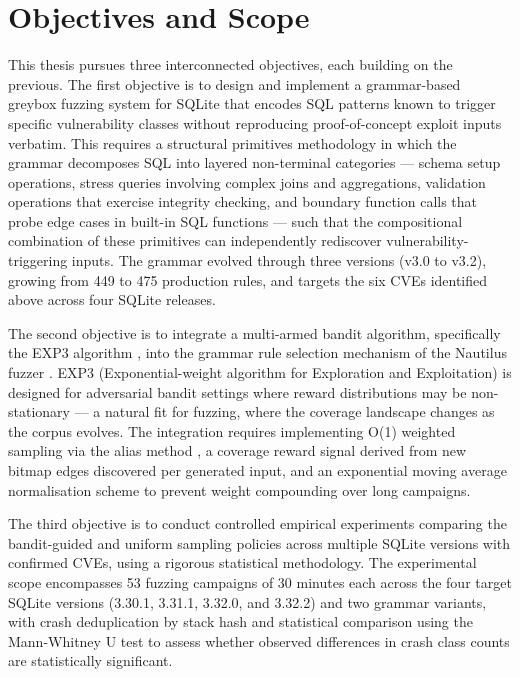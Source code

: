 \section{Objectives and Scope}

This thesis pursues three interconnected objectives, each building on the previous. The first objective is to design and implement a grammar-based greybox fuzzing system for SQLite that encodes SQL patterns known to trigger specific vulnerability classes without reproducing proof-of-concept exploit inputs verbatim. This requires a structural primitives methodology in which the grammar decomposes SQL into layered non-terminal categories — schema setup operations, stress queries involving complex joins and aggregations, validation operations that exercise integrity checking, and boundary function calls that probe edge cases in built-in SQL functions — such that the compositional combination of these primitives can independently rediscover vulnerability-triggering inputs. The grammar evolved through three versions (v3.0 to v3.2), growing from 449 to 475 production rules, and targets the six CVEs identified above across four SQLite releases.

The second objective is to integrate a multi-armed bandit algorithm, specifically the EXP3 algorithm \cite{exp3}, into the grammar rule selection mechanism of the Nautilus fuzzer \cite{nautilus}. EXP3 (Exponential-weight algorithm for Exploration and Exploitation) is designed for adversarial bandit settings where reward distributions may be non-stationary — a natural fit for fuzzing, where the coverage landscape changes as the corpus evolves. The integration requires implementing O(1) weighted sampling via the alias method \cite{loadeddice}, a coverage reward signal derived from new bitmap edges discovered per generated input, and an exponential moving average normalisation scheme to prevent weight compounding over long campaigns.

The third objective is to conduct controlled empirical experiments comparing the bandit-guided and uniform sampling policies across multiple SQLite versions with confirmed CVEs, using a rigorous statistical methodology. The experimental scope encompasses 53 fuzzing campaigns of 30 minutes each across the four target SQLite versions (3.30.1, 3.31.1, 3.32.0, and 3.32.2) and two grammar variants, with crash deduplication by stack hash and statistical comparison using the Mann-Whitney U test \cite{mannwhitney} to assess whether observed differences in crash class counts are statistically significant.

